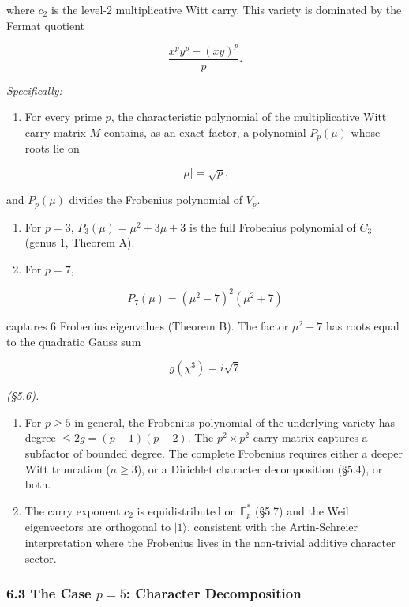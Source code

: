 \documentclass[
  11pt,
]{article}
\providecommand{\tightlist}{%
  \setlength{\itemsep}{0pt}\setlength{\parskip}{0pt}}
\begin{document}
where \(c_2\) is the level-2 multiplicative Witt carry. This variety is
dominated by the Fermat quotient

\[\frac{x^p y^p - (xy)^p}{p}.\]

\emph{Specifically:}

\begin{enumerate}
\def\labelenumi{(\alph{enumi})}
\tightlist
\item
  For every prime \(p\), the characteristic polynomial of the multiplicative
  Witt carry matrix \(M\) contains, as an exact factor, a polynomial
  \(P_p(\mu)\) whose roots lie on
\end{enumerate}

\[\lvert \mu \rvert = \sqrt{p},\]

and \(P_p(\mu)\) divides the Frobenius polynomial of \(V_p\).

\begin{enumerate}
\def\labelenumi{(\alph{enumi})}
\setcounter{enumi}{1}
\item
  For \(p = 3\), \(P_3(\mu) = \mu^2 + 3\mu + 3\) is the full Frobenius
  polynomial of \(C_3\) (genus 1, Theorem A).
\item
  For \(p = 7\),
\end{enumerate}

\[P_7(\mu) = (\mu^2 - 7)^2(\mu^2 + 7)\]

captures 6 Frobenius eigenvalues (Theorem B). The factor \(\mu^2 + 7\) has roots
equal to the quadratic Gauss sum

\[g(\chi^3) = i\sqrt{7}\]

\emph{(§5.6).}

\begin{enumerate}
\def\labelenumi{(\alph{enumi})}
\setcounter{enumi}{3}
\item
  For \(p \geq 5\) in general, the Frobenius polynomial of the underlying
  variety has degree \(\leq 2g = (p-1)(p-2)\). The \(p^2 \times p^2\) carry
  matrix captures a subfactor of bounded degree. The complete Frobenius requires
  either a deeper Witt truncation (\(n \geq 3\)), or a Dirichlet character
  decomposition (§5.4), or both.
\item
  The carry exponent \(c_2\) is equidistributed on \(\mathbb{F}_p^{\ast}\)
  (§5.7) and the Weil eigenvectors are orthogonal to \(\lvert 1 \rangle\),
  consistent with the Artin-Schreier interpretation where the Frobenius lives in
  the non-trivial additive character sector.
\end{enumerate}

\subsubsection{\texorpdfstring{6.3 The Case \(p = 5\): Character
Decomposition}{6.3 The Case p = 5: Character Decomposition}}\label{the-case-p-5-character-decomposition}
\end{document}
